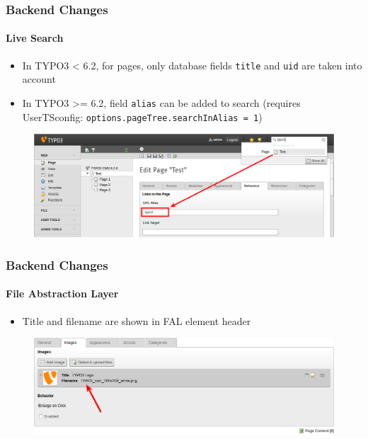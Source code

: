 
\begin{frame}[fragile]
	\frametitle{Backend Changes}
	\framesubtitle{Live Search}

	\begin{itemize}
		\item In TYPO3 < 6.2, for pages, only database fields \texttt{title} and \texttt{uid} are taken into account
		\item In TYPO3 >= 6.2, field \texttt{alias} can be added to search\newline
			(requires UserTSconfig: \texttt{options.pageTree.searchInAlias = 1})
	\end{itemize}

	\begin{figure}
		\includegraphics[width=0.95\linewidth]{Images/BackendChanges/LiveSearchInAlias.png}
	\end{figure}

\end{frame}


\begin{frame}[fragile]
	\frametitle{Backend Changes}
	\framesubtitle{File Abstraction Layer}

	\begin{itemize}
		\item Title and filename are shown in FAL element header
	\end{itemize}

	\begin{figure}
		\includegraphics[width=0.95\linewidth]{Images/BackendChanges/FalTitleAndFilename.png}
	\end{figure}

\end{frame}

